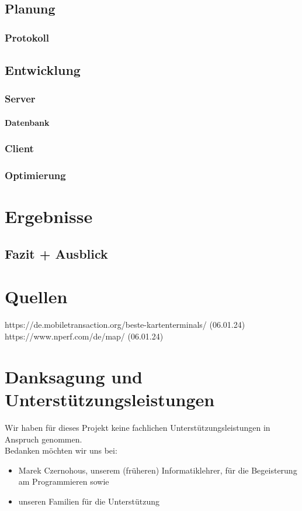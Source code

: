 \documentclass[a4paper,12pt,ngerman]{scrreport}
\begin{document}
    \section{Planung}

    \subsection{Protokoll}

    \section{Entwicklung}
    \subsection{Server}
    \subsubsection{Datenbank}
    \subsection{Client}
    \subsection{Optimierung}


    \chapter{Ergebnisse}

    \section{Fazit + Ausblick}

    \chapter{Quellen}
    https://de.mobiletransaction.org/beste-kartenterminals/ (06.01.24)
    https://www.nperf.com/de/map/ (06.01.24)

    \chapter{Danksagung und Unterstützungsleistungen}
    Wir haben für dieses Projekt keine fachlichen Unterstützungsleistungen in Anspruch genommen.\\
    Bedanken möchten wir uns bei:
    \begin{itemize}
        \item Marek Czernohous, unserem (früheren) Informatiklehrer, für die Begeisterung am Programmieren sowie
        \item unseren Familien für die Unterstützung
    \end{itemize}
\end{document}
